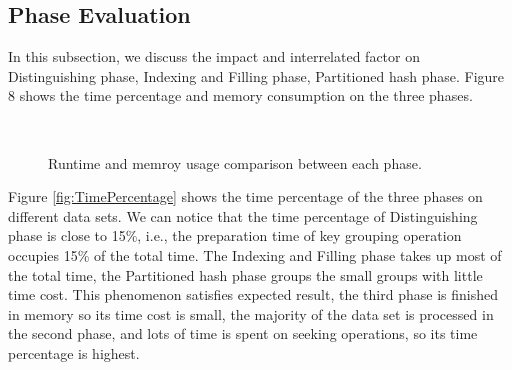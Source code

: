 \subsection{Phase Evaluation}
In this subsection, we discuss the impact and interrelated factor on Distinguishing phase, Indexing and Filling phase, Partitioned hash phase. Figure 8 shows the time percentage and memory consumption on the three phases. 
\begin{figure}[htbp]	
	\label{fig: PhaseEvaluation}
    \hspace{0.23cm}
    \\    
	\caption{Runtime and memroy usage comparison between each phase.}
		
\end{figure}

Figure \ref{fig:TimePercentage} shows the time percentage of the three phases on different data sets. We can notice that the time percentage of Distinguishing phase is close to 15\%, i.e., the preparation time of key grouping operation occupies 15\% of the total time. The Indexing and Filling phase takes up most of the total time, the Partitioned hash phase groups the small groups with little time cost. This phenomenon satisfies expected result, the third phase is finished in memory so its time cost is small, the majority of the data set is processed in the second phase, and lots of time is spent on seeking operations, so its time percentage is highest.

